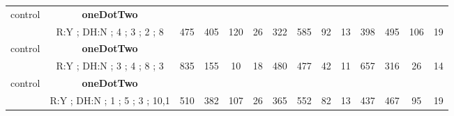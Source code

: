 \begin{table}[H]
{\begin{tabular}{|c|c|c|c|c|c|c|c|c|c|c|c|c|c|}
control & \cellcolor{blue!15}\textbf{oneDotTwo}& {\color[HTML]{00009B} } & {\color[HTML]{9A0000} } & {\color[HTML]{009901} } &  & {\color[HTML]{00009B} } & {\color[HTML]{9A0000} } & {\color[HTML]{009901} } &  & {\color[HTML]{00009B} } & {\color[HTML]{9A0000} } & {\color[HTML]{009901} } &  \\ 
 & \cellcolor{ blue!15}R:Y ; DH:N ; 4 ; 3 ; 2 ; 8 & \multirow{-2}{*}{{\color[HTML]{00009B} 475}} & \multirow{-2}{*}{{\color[HTML]{9A0000} 405}} & \multirow{-2}{*}{{\color[HTML]{009901} 120}} & \multirow{-2}{*}{26} & \multirow{-2}{*}{{\color[HTML]{00009B} 322}} & \multirow{-2}{*}{{\color[HTML]{9A0000} 585}} & \multirow{-2}{*}{{\color[HTML]{009901} 92}} & \multirow{-2}{*}{13} & \multirow{-2}{*}{{\color[HTML]{00009B} 398}} & \multirow{-2}{*}{{\color[HTML]{9A0000} 495}} & \multirow{-2}{*}{{\color[HTML]{009901} 106}} & \multirow{-2}{*}{19} \\ \hline

control & \cellcolor{blue!15}\textbf{oneDotTwo}& {\color[HTML]{00009B} } & {\color[HTML]{9A0000} } & {\color[HTML]{009901} } &  & {\color[HTML]{00009B} } & {\color[HTML]{9A0000} } & {\color[HTML]{009901} } &  & {\color[HTML]{00009B} } & {\color[HTML]{9A0000} } & {\color[HTML]{009901} } &  \\ 
 & \cellcolor{ blue!15}R:Y ; DH:N ; 3 ; 4 ; 8 ; 3 & \multirow{-2}{*}{{\color[HTML]{00009B} 835}} & \multirow{-2}{*}{{\color[HTML]{9A0000} 155}} & \multirow{-2}{*}{{\color[HTML]{009901} 10}} & \multirow{-2}{*}{18} & \multirow{-2}{*}{{\color[HTML]{00009B} 480}} & \multirow{-2}{*}{{\color[HTML]{9A0000} 477}} & \multirow{-2}{*}{{\color[HTML]{009901} 42}} & \multirow{-2}{*}{11} & \multirow{-2}{*}{{\color[HTML]{00009B} 657}} & \multirow{-2}{*}{{\color[HTML]{9A0000} 316}} & \multirow{-2}{*}{{\color[HTML]{009901} 26}} & \multirow{-2}{*}{14} \\ \hline

control & \cellcolor{blue!15}\textbf{oneDotTwo}& {\color[HTML]{00009B} } & {\color[HTML]{9A0000} } & {\color[HTML]{009901} } &  & {\color[HTML]{00009B} } & {\color[HTML]{9A0000} } & {\color[HTML]{009901} } &  & {\color[HTML]{00009B} } & {\color[HTML]{9A0000} } & {\color[HTML]{009901} } &  \\ 
 & \cellcolor{ blue!15}R:Y ; DH:N ; 1 ; 5 ; 3 ; 10,1 & \multirow{-2}{*}{{\color[HTML]{00009B} 510}} & \multirow{-2}{*}{{\color[HTML]{9A0000} 382}} & \multirow{-2}{*}{{\color[HTML]{009901} 107}} & \multirow{-2}{*}{26} & \multirow{-2}{*}{{\color[HTML]{00009B} 365}} & \multirow{-2}{*}{{\color[HTML]{9A0000} 552}} & \multirow{-2}{*}{{\color[HTML]{009901} 82}} & \multirow{-2}{*}{13} & \multirow{-2}{*}{{\color[HTML]{00009B} 437}} & \multirow{-2}{*}{{\color[HTML]{9A0000} 467}} & \multirow{-2}{*}{{\color[HTML]{009901} 95}} & \multirow{-2}{*}{19} \\ \hline


\end{tabular}}
\end{table}
